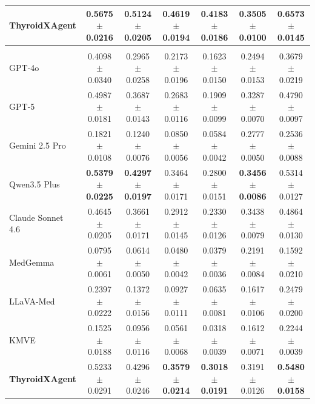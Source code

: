 \begin{table}[p]
\begin{threeparttable}
\begin{tabular}{lcccccc}
\rowcolor{lightgray}
\textbf{ThyroidXAgent}
& \textbf{0.5675$\pm$0.0216}
& \textbf{0.5124$\pm$0.0205}
& \textbf{0.4619$\pm$0.0194}
& \textbf{0.4183$\pm$0.0186}
& \textbf{0.3505$\pm$0.0100}
& \textbf{0.6573$\pm$0.0145} \\

\midrule

\rowcolor{gray!20}
\multicolumn{7}{c}{\textbf{ZJH-TS Testset} ($n=150$)} \\

GPT-4o~\cite{openai_gpt4_2024}
& 0.4098$\pm$0.0340
& 0.2965$\pm$0.0258
& 0.2173$\pm$0.0196
& 0.1623$\pm$0.0150
& 0.2494$\pm$0.0153
& 0.3679$\pm$0.0219 \\

GPT-5~\cite{openai2025gpt5systemcard}
& 0.4987$\pm$0.0181
& 0.3687$\pm$0.0143
& 0.2683$\pm$0.0116
& 0.1909$\pm$0.0099
& 0.3287$\pm$0.0070
& 0.4790$\pm$0.0097 \\

Gemini 2.5 Pro~\cite{comanici_gemini_2025}
& 0.1821$\pm$0.0108
& 0.1240$\pm$0.0076
& 0.0850$\pm$0.0056
& 0.0584$\pm$0.0042
& 0.2777$\pm$0.0050
& 0.2536$\pm$0.0088 \\

Qwen3.5 Plus~\cite{yang_qwen3_2025}
& \textbf{0.5379$\pm$0.0225}
& \textbf{0.4297$\pm$0.0197}
& 0.3464$\pm$0.0171
& 0.2800$\pm$0.0151
& \textbf{0.3456$\pm$0.0086}
& 0.5314$\pm$0.0127 \\

Claude Sonnet 4.6
& 0.4645$\pm$0.0205
& 0.3661$\pm$0.0171
& 0.2912$\pm$0.0145
& 0.2330$\pm$0.0126
& 0.3438$\pm$0.0079
& 0.4864$\pm$0.0130 \\

MedGemma~\cite{sellergren2025medgemma}
& 0.0795$\pm$0.0061
& 0.0614$\pm$0.0050
& 0.0480$\pm$0.0042
& 0.0379$\pm$0.0036
& 0.2191$\pm$0.0084
& 0.1592$\pm$0.0210 \\

LLaVA-Med~\cite{li_llavamed_2023}
& 0.2397$\pm$0.0222
& 0.1372$\pm$0.0156
& 0.0927$\pm$0.0111
& 0.0635$\pm$0.0081
& 0.1617$\pm$0.0106
& 0.2479$\pm$0.0200 \\

KMVE~\cite{li_ultrasound_2024}
& 0.1525$\pm$0.0188
& 0.0956$\pm$0.0116
& 0.0561$\pm$0.0068
& 0.0318$\pm$0.0039
& 0.1612$\pm$0.0071
& 0.2244$\pm$0.0039 \\

\rowcolor{lightgray}
\textbf{ThyroidXAgent}
& 0.5233$\pm$0.0291
& 0.4296$\pm$0.0246
& \textbf{0.3579$\pm$0.0214}
& \textbf{0.3018$\pm$0.0191}
& 0.3191$\pm$0.0126
& \textbf{0.5480$\pm$0.0158} \\

\bottomrule
\end{tabular}

\end{threeparttable}
\end{table}

